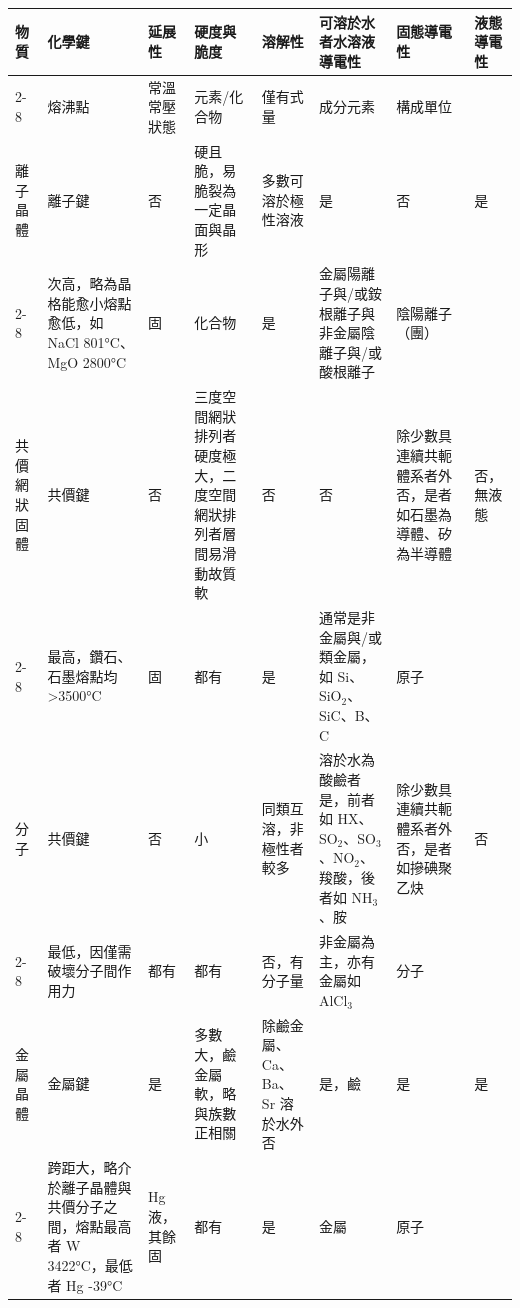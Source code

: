 \documentclass[a4paper,12pt]{report}
\begin{document}
\begin{longtable}[c]{|p{0.06\tw}|p{0.16\tw}|p{0.06\tw}|p{0.12\tw}|p{0.12\tw}|p{0.12\tw}|p{0.1\tw}|p{0.06\tw}|}
\hline
物質 & 化學鍵 & 延展性 & 硬度與脆度 & 溶解性 & 可溶於水者水溶液導電性 & 固態導電性 & 液態導電性 \\\cline{2-8}
& 熔沸點 & 常溫常壓狀態 & 元素/化合物 & 僅有式量 & 成分元素 & 構成單位 & \\\hline
\endhead
離子晶體 & 離子鍵 & 否 & 硬且脆，易脆裂為一定晶面與晶形 & 多數可溶於極性溶液 & 是 & 否 & 是 \\\cline{2-8}
& 次高，略為晶格能愈小熔點愈低，如 NaCl 801°C、MgO 2800°C & 固 & 化合物 & 是 & 金屬陽離子與/或銨根離子與非金屬陰離子與/或酸根離子 & 陰陽離子（團） & \\\hline
共價網狀固體 & 共價鍵 & 否 & 三度空間網狀排列者硬度極大，二度空間網狀排列者層間易滑動故質軟 & 否 & 否 & 除少數具連續共軛體系者外否，是者如石墨為導體、矽為半導體 & 否，無液態 \\\cline{2-8}
& 最高，鑽石、石墨熔點均>3500°C & 固 & 都有 & 是 & 通常是非金屬與/或類金屬，如 Si、SiO$_2$、SiC、B、C & 原子 & \\\hline
分子 & 共價鍵 & 否 & 小 & 同類互溶，非極性者較多 & 溶於水為酸鹼者是，前者如 HX、SO$_2$、SO$_3$、NO$_2$、羧酸，後者如 NH$_3$、胺 & 除少數具連續共軛體系者外否，是者如摻碘聚乙炔 & 否 \\\cline{2-8}
& 最低，因僅需破壞分子間作用力 & 都有 & 都有 & 否，有分子量 & 非金屬為主，亦有金屬如 AlCl$_3$ & 分子 & \\\hline
金屬晶體 & 金屬鍵 & 是 & 多數大，鹼金屬軟，略與族數正相關 & 除鹼金屬、Ca、Ba、Sr 溶於水外否 & 是，鹼 & 是 & 是 \\\cline{2-8}
& 跨距大，略介於離子晶體與共價分子之間，熔點最高者 W 3422°C，最低者 Hg -39°C & 
Hg 液，其餘固 & 都有 & 是 & 金屬 & 原子 & \\\hline
\end{longtable}\FB
\end{document}
